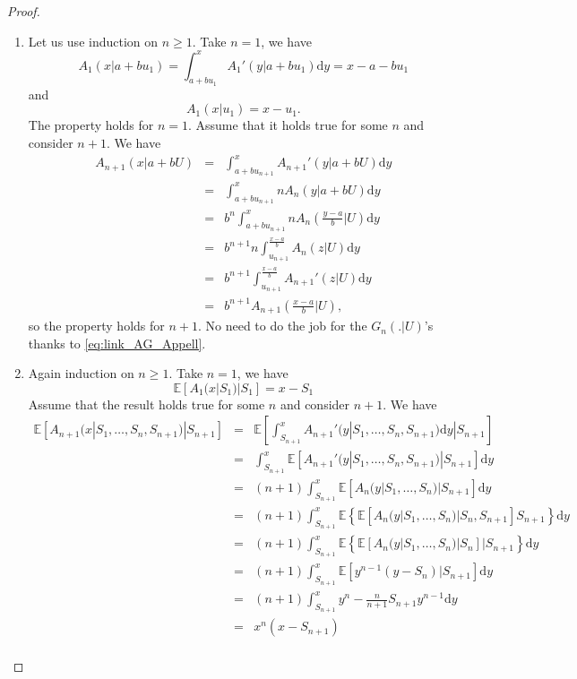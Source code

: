 \begin{proof}
\begin{enumerate}
  \item Let us use induction on $n\geq1$. Take $n = 1$, we have
  $$
  A_1(x|a + bu_1) = \int_{a+bu_1}^{x} A_1'(y|a+bu_1)\text{d}y = x - a - bu_1 
  $$
  and 
   $$
  A_1(x|u_1) = x-u_1.
  $$
  The property holds for $n = 1$. Assume that it holds true for some $n$ and consider $n+1$. We have
  \begin{eqnarray*}
  A_{n+1}(x|a+bU) &=& \int^{x}_{a+b u_{n+1}}A_{n+1}'(y|a+bU)\text{d}y\\
  &=& \int^{x}_{a+b u_{n+1}}nA_{n}(y|a+bU)\text{d}y\\
  &=&b^n\int^{x}_{a+b u_{n+1}}nA_{n}\left(\frac{y-a}{b}\Big|U\right)\text{d}y\\
  &=&b^{n+1}n\int^{\frac{x-a}{b}}_{u_{n+1}}A_{n}\left(z\Big|U\right)\text{d}y\\
  &=&b^{n+1}\int^{\frac{x-a}{b}}_{u_{n+1}}A_{n+1}'\left(z\Big|U\right)\text{d}y\\
  &=&b^{n+1}A_{n+1}\left(\frac{x-a}{b}\Big|U\right),
  \end{eqnarray*}
  so the property holds for $n+1$. No need to do the job for the $G_n(.|U)$'s thanks to \eqref{eq:link_AG_Appell}.
\item Again induction on $n\geq1$. Take $n = 1$, we have
$$
\mathbb{E}[A_1(x|S_1)|S_1] = x-S_1
$$
Assume that the result holds true for some $n$ and consider $n+1$. We have 
\begin{eqnarray*}
\mathbb{E}\left[A_{n+1}(x|S_1,\ldots, S_n,S_{n+1})|S_{n+1}\right]&=&\mathbb{E}\left[\int_{S_{n+1}}^x A_{n+1}'(y|S_1,\ldots, S_n,S_{n+1})\text{d}y|S_{n+1}\right]\\
&=&\int_{S_{n+1}}^x\mathbb{E}\left[ A_{n+1}'(y|S_1,\ldots, S_n,S_{n+1})|S_{n+1}\right]\text{d}y\\
&=&(n+1)\int_{S_{n+1}}^x\mathbb{E}\left[A_{n}(y|S_1,\ldots, S_n)|S_{n+1}\right]\text{d}y\\
&=&(n+1)\int_{S_{n+1}}^x\mathbb{E}\left\{\mathbb{E}\left[A_{n}(y|S_1,\ldots, S_n)|S_n,S_{n+1}\right]S_{n+1}\right\}\text{d}y\\
&=&(n+1)\int_{S_{n+1}}^x\mathbb{E}\left\{\mathbb{E}\left[A_{n}(y|S_1,\ldots, S_n)|S_n\right]|S_{n+1}\right\}\text{d}y\\
&=&(n+1)\int_{S_{n+1}}^x\mathbb{E}\left[y^{n-1}(y-S_n)|S_{n+1}\right]\text{d}y\\
&=&(n+1)\int_{S_{n+1}}^xy^n-\frac{n}{n+1}S_{n+1}y^{n-1} \text{d}y\\
&=&x^n(x-S_{n+1})\\

\end{eqnarray*}
\end{enumerate}
\end{proof}
